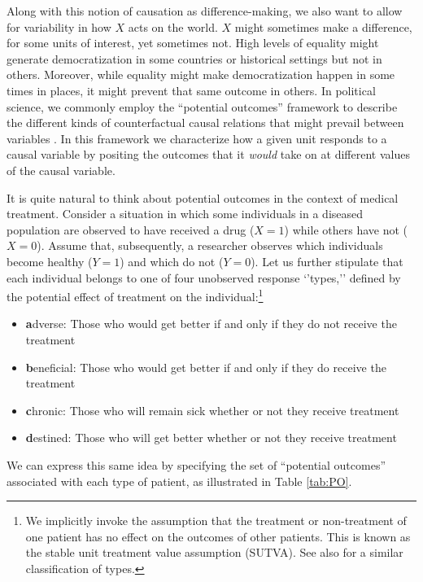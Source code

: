 \documentclass[
  12pt,
]{book}
\providecommand{\tightlist}{%
  \setlength{\itemsep}{0pt}\setlength{\parskip}{0pt}}
\begin{document}
Along with this notion of causation as difference-making, we also want to allow for variability in how \(X\) acts on the world. \(X\) might sometimes make a difference, for some units of interest, yet sometimes not. High levels of equality might generate democratization in some countries or historical settings but not in others. Moreover, while equality might make democratization happen in some times in places, it might prevent that same outcome in others. In political science, we commonly employ the ``potential outcomes'' framework to describe the different kinds of counterfactual causal relations that might prevail between variables \citep{Rubin1974}. In this framework we characterize how a given unit responds to a causal variable by positing the outcomes that it \emph{would} take on at different values of the causal variable.

It is quite natural to think about potential outcomes in the context of medical treatment. Consider a situation in which some individuals in a diseased population are observed to have received a drug (\(X=1\)) while others have not (\(X=0\)). Assume that, subsequently, a researcher observes which individuals become healthy (\(Y=1\)) and which do not (\(Y=0\)). Let us further stipulate that each individual belongs to one of four unobserved response `'types,'' defined by the potential effect of treatment on the individual:\footnote{We implicitly invoke the assumption that the treatment or non-treatment of one patient has no effect on the outcomes of other patients. This is known as the stable unit treatment value assumption (SUTVA). See also \citet{HerronQuinn} for a similar classification of types.}

\begin{itemize}
\tightlist
\item
  \textbf{a}dverse: Those who would get better if and only if they do not receive the treatment
\item
  \textbf{b}eneficial: Those who would get better if and only if they do receive the treatment
\item
  \textbf{c}hronic: Those who will remain sick whether or not they receive treatment
\item
  \textbf{d}estined: Those who will get better whether or not they receive treatment
\end{itemize}

We can express this same idea by specifying the set of ``potential outcomes'' associated with each type of patient, as illustrated in Table \ref{tab:PO}.
\end{document}
